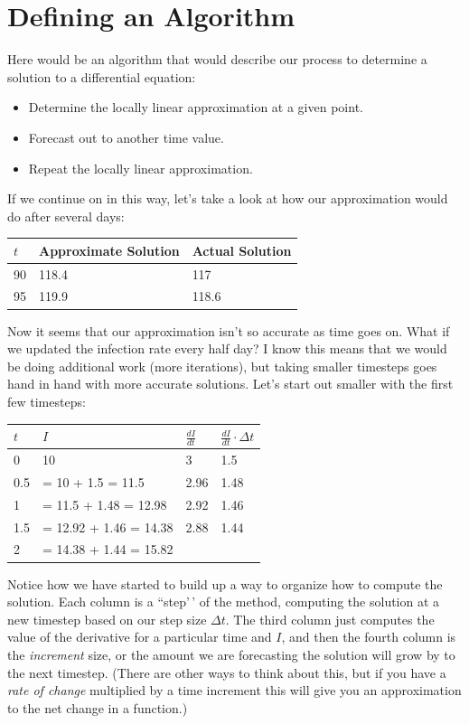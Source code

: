 \documentclass[
]{book}
\providecommand{\tightlist}{%
  \setlength{\itemsep}{0pt}\setlength{\parskip}{0pt}}
\theoremstyle{definition}
\theoremstyle{definition}
\theoremstyle{definition}
\theoremstyle{remark}
\begin{document}
\hypertarget{defining-an-algorithm}{%
\section{Defining an Algorithm}\label{defining-an-algorithm}}

Here would be an algorithm that would describe our process to determine a solution to a differential equation:

\begin{itemize}
\tightlist
\item
  Determine the locally linear approximation at a given point.
\item
  Forecast out to another time value.
\item
  Repeat the locally linear approximation.
\end{itemize}

If we continue on in this way, let's take a look at how our approximation would do after several days:

\begin{longtable}[]{@{}lll@{}}
\toprule
\(t\) & Approximate Solution & Actual Solution \\
\midrule
\endhead
90 & 118.4 & 117 \\
95 & 119.9 & 118.6 \\
\bottomrule
\end{longtable}

Now it seems that our approximation isn't so accurate as time goes on. What if we updated the infection rate every half day? I know this means that we would be doing additional work (more iterations), but taking smaller timesteps goes hand in hand with more accurate solutions. Let's start out smaller with the first few timesteps:

\begin{longtable}[]{@{}llll@{}}
\toprule
\(t\) & \(I\) & \(\displaystyle \frac{dI}{dt}\) & \(\displaystyle \frac{dI}{dt} \cdot \Delta t\) \\
\midrule
\endhead
0 & 10 & 3 & 1.5 \\
0.5 & = 10 + 1.5 = 11.5 & 2.96 & 1.48 \\
1 & = 11.5 + 1.48 = 12.98 & 2.92 & 1.46 \\
1.5 & = 12.92 + 1.46 = 14.38 & 2.88 & 1.44 \\
2 & = 14.38 + 1.44 = 15.82 & & \\
\bottomrule
\end{longtable}

Notice how we have started to build up a way to organize how to compute the solution. Each column is a ``step'\,' of the method, computing the solution at a new timestep based on our step size \(\Delta t\). The third column just computes the value of the derivative for a particular time and \(I\), and then the fourth column is the \emph{increment} size, or the amount we are forecasting the solution will grow by to the next timestep. (There are other ways to think about this, but if you have a \emph{rate of change } multiplied by a time increment this will give you an approximation to the net change in a function.)
\end{document}

